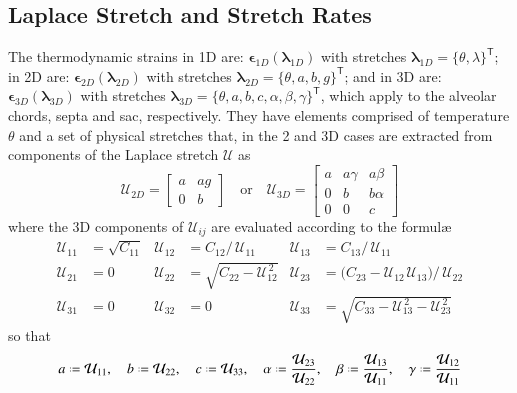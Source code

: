\subsection{Laplace Stretch and Stretch Rates}

The thermo\-dynamic strains in 1D are: $\boldsymbol{\epsilon}_{1D} ( \boldsymbol{\lambda}_{1D} )$ with stretches $\boldsymbol{\lambda}_{1D} = \{ \theta , \lambda \}^{\mathsf{T}}$; in 2D are: $\boldsymbol{\epsilon}_{2D} ( \boldsymbol{\lambda}_{2D} )$ with stretches $\boldsymbol{\lambda}_{2D} = \{ \theta , a , b , g \}^{\mathsf{T}}$; and in 3D are: $\boldsymbol{\epsilon}_{3D} ( \boldsymbol{\lambda}_{3D} )$ with stretches $\boldsymbol{\lambda}_{3D} = \{ \theta , a , b , c , \alpha , \beta , \gamma \}^{\mathsf{T}}$, which apply to the alveolar chords, septa and sac, respectively.  They have elements comprised of temperature $\theta$ and a set of physical stretches that, in the 2 and 3D cases are extracted from components of the Laplace stretch $\boldsymbol{\mathcal{U}}$ as
\begin{equation}
\boldsymbol{\mathcal{U}}_{2D} = 
\begin{bmatrix} 
a & a g \\ 0 & b 
\end{bmatrix}
\quad \text{or} \quad 
\boldsymbol{\mathcal{U}}_{3D} = 
\begin{bmatrix}
a & a \gamma & a \beta \\ 0 & b & b \alpha \\ 0 & 0 & c
\end{bmatrix}
\label{LaplaceStretch}
\end{equation}
where the 3D components of $\mathcal{U}_{ij}$ are evaluated according to the formul\ae\
\begin{equation}
\begin{aligned}
\mathcal{U}_{11} & = \sqrt{C_{11}} & 
\mathcal{U}_{12} & = C_{12} / \, \mathcal{U}_{11} &
\mathcal{U}_{13} & = C_{13} / \, \mathcal{U}_{11} \\
\mathcal{U}_{21} & = 0 &
\mathcal{U}_{22} & = \sqrt{C_{22} - \mathcal{U}_{12}^{\,2}} &
\mathcal{U}_{23} & = \bigl( C_{23} - \mathcal{U}_{12\,} \mathcal{U}_{13} \bigr) / \, \mathcal{U}_{22} \\
\mathcal{U}_{31} & = 0 &
\mathcal{U}_{32} & = 0 & 
\mathcal{U}_{33} & = \sqrt{C_{33} - \mathcal{U}_{13}^{\,2} - \mathcal{U}_{23}^{\,2}}
\end{aligned}
\label{LagrangianLaplaceStretch}
\end{equation}
so that
\begin{equation}
a \defeq \mathcal{U}_{11} , \quad
b \defeq \mathcal{U}_{22} , \quad
c \defeq \mathcal{U}_{33} , \quad
\alpha \defeq \frac{\mathcal{U}_{23}}{\mathcal{U}_{22}} , \quad
\beta \defeq \frac{\mathcal{U}_{13}}{\mathcal{U}_{11}} , \quad
\gamma \defeq \frac{\mathcal{U}_{12}}{\mathcal{U}_{11}}
\label{LagrangianPhysicalAttributes}
\end{equation}
